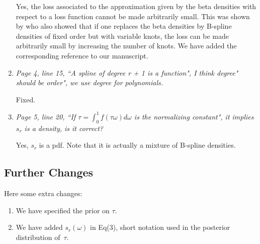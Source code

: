 \documentclass{scrartcl}
\newcommand{\refereeQuote}{\textit }
\newcommand{\response}{}
\begin{document}
\begin{enumerate}
	\response{Yes, the loss associated to the approximation given by the beta densities with respect to a loss function cannot be made arbitrarily small. This was shown by \cite{Perron:2001} who also showed that if one replaces the beta densities by B-spline densities of fixed order but with variable knots, the loss can be made arbitrarily small by increasing the number of knots.  We have added the corresponding reference to our manuscript.} \bigskip	
	
	\item \refereeQuote{Page 4, line 15, ``A spline of degree r + 1 is a function", I think degree" should be order", we use degree for polynomials.}\smallskip
	
	\response{Fixed.} \bigskip	
	
	\item \refereeQuote{Page 5, line 20, ``If $\tau = \int_0^1f(\tau \omega)d \omega$ is the normalizing constant", it implies $s_r$ is a density, is it correct?}
	
	\response{Yes, $s_r$ is a pdf.  Note that it is actually a mixture of B-spline densities.}
\end{enumerate}

\subsection*{Further Changes}
Here some extra changes:
\begin{enumerate}
	\item We have specified the prior on $\tau$. 
	\item We have added $s_r(\omega)$ in Eq(3), short notation used in the posterior distribution of~$\tau$.	
\end{enumerate}




\end{document}
